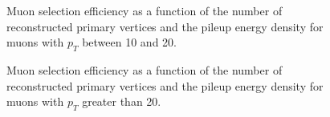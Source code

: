\begin{figure}[!htbp]
\begin{center}
\caption{Muon selection efficiency as a function of the number of reconstructed primary vertices
and the pileup energy density for muons with $p_{T}$ between 10 and 20\GeV.}
\label{fig:mu_selectionEfficiency_LowPt_VsPileup}
\end{center}
\end{figure}



\begin{figure}[!htbp]
\begin{center}
\caption{Muon selection efficiency as a function of the number of reconstructed primary vertices
and the pileup energy density for muons with $p_{T}$ greater than 20\GeV.}
\label{fig:mu_selectionEfficiency_HighPt_VsPileup}
\end{center}
\end{figure}



